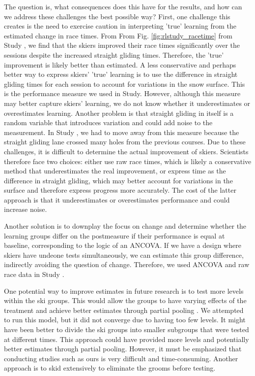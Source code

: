 The question is, what consequences does this have for the results, and how can we address these challenges the best possible way? First, one challenge this creates is the need to exercise caution in interpreting 'true' learning from the estimated change in race times. From From Fig. \ref{fig:rlstudy_racetime} from Study , we find that the skiers improved their race times significantly over the sessions despite the increased straight gliding times. Therefore, the 'true' improvement is likely better than estimated. A less conservative and perhaps better way to express skiers' 'true' learning is to use the difference in straight gliding times for each session to account for variations in the snow surface. This is the performance measure we used in Study. However, although this measure may better capture skiers' learning, we do not know whether it underestimates or overestimates learning. Another problem is that straight gliding in itself is a random variable that introduces variation and could add noise to the measurement. In Study , we had to move away from this measure because the straight gliding lane crossed many holes from the previous courses. Due to these challenges, it is difficult to determine the actual improvement of skiers. Scientists therefore face two choices: either use raw race times, which is likely a conservative method that underestimates the real improvement, or express time as the difference in straight gliding, which may better account for variations in the surface and therefore express progress more accurately. The cost of the latter approach is that it underestimates or overestimates performance and could increase noise. 

Another solution is to downplay the focus on change and determine whether the learning groups differ on the postmeasure if their performance is equal at baseline, corresponding to the logic of an ANCOVA. If we have a design where skiers have undeone tests simultaneously, we can estimate this group difference, indirectly avoiding the question of change. Therefore, we used ANCOVA and raw race data in Study .

One potential way to improve estimates in future research is to test more levels within the ski groups. This would allow the groups to have varying effects of the treatment and achieve better estimates through partial pooling \cite{mcelreath_statistical_2018}. We attempted to run this model, but it did not converge due to having too few levels. It might have been better to divide the ski groups into smaller subgroups that were tested at different times. This approach could have provided more levels and potentially better estimates through partial pooling. However, it must be emphasized that conducting studies such as ours is very difficult and time-consuming. Another approach is to skid extensively to eliminate the grooms before testing. 


